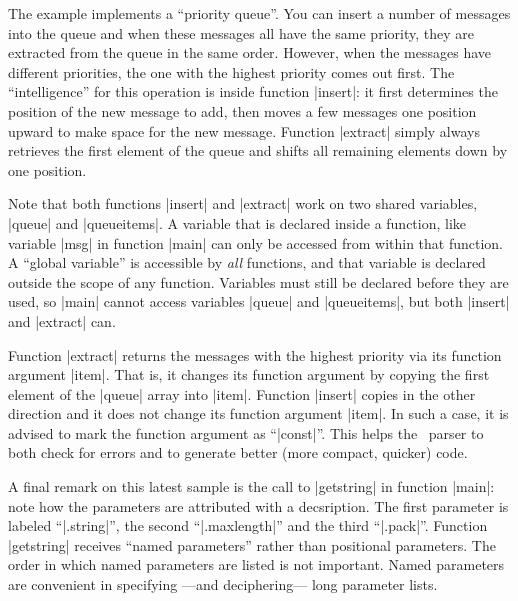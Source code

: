 The example implements a ``priority queue''. You can insert a number of
messages into the queue and when these messages all have the same priority,
they are extracted from the queue in the same order. However, when the
messages have different priorities, the one with the highest priority comes
out first. The ``intelligence'' for this operation is inside function |insert|:
it first determines the position of the new message to add, then moves a few
messages one position upward to make space for the new message. Function
|extract| simply always retrieves the first element of the queue and shifts all
remaining elements down by one position.

Note that both functions |insert| and |extract| work on two shared variables,
|queue| and |queueitems|. A variable that is declared inside a function, like
variable |msg| in function |main| can only be accessed from within that
function. A ``global variable'' is accessible by {\it all\/} functions, and that
variable is declared outside the scope of any function. Variables must still be
declared before they are used, so |main| cannot access variables |queue| and
|queueitems|, but both |insert| and |extract| can.

Function |extract| returns the messages with the highest priority via its
function argument |item|. That is, it changes its function argument by copying
the first element of the |queue| array into |item|. Function |insert| copies
in the other direction and it does not change its function argument |item|. In
such a case, it is advised to mark the function argument as ``|const|''. This
helps the \Small\ parser to both check for errors and to generate better (more
compact, quicker) code.

\noindent{}%
A final remark on this latest sample is the call to |getstring| in function
|main|: note how the parameters are attributed with a decsription. The first
parameter is labeled ``|.string|'', the second ``|.maxlength|'' and the
third ``|.pack|''. Function |getstring| receives ``named parameters'' rather
than positional parameters. The order in which named parameters are listed is
not important. Named parameters are convenient in specifying ---and deciphering---
long parameter lists.

